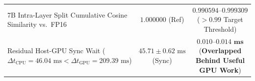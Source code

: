 \documentclass[10pt,twocolumn]{article}
\begin{document}
\begin{table}[t]
{\begin{tabular}{lcc}
7B Intra-Layer Split Cumulative Cosine Similarity vs.\ FP16 & $1.000000$ (Ref) & $\mathbf{0.990594\text{--}0.999309}$ ($> 0.99$ Target Threshold) \\
Residual Host-GPU Sync Wait ($\Delta t_{\text{CPU}} = 46.04\text{ ms} < \Delta t_{\text{GPU}} = 209.39\text{ ms}$) & $45.71 \pm 0.62\text{ ms}$ (Sync) & $\mathbf{0.010\text{--}0.014\text{ ms}}$ (\textbf{Overlapped Behind Useful GPU Work}) \\
\bottomrule
\end{tabular}%
}
\end{table}

\begin{table}[t]
\centering
\caption{\textbf{Methodology 2B (Aggregate): Cross-Scale ($1.5\text{B GPU} + 7\text{B Split System RAM}$) Reasoning Performance on \texttt{P01--P10}.} Strictly partitioned into \textbf{Category I (Unsupervised / Zero-QA Regimes, $\mathcal{L}_{\text{CE}}=0$)} and \textbf{Category II (Supervised / Task-Calibrated Regimes)}.}
\label{tab:method2_agg}
\setlength{\tabcolsep}{5.2pt}
\end{table}
\end{document}

